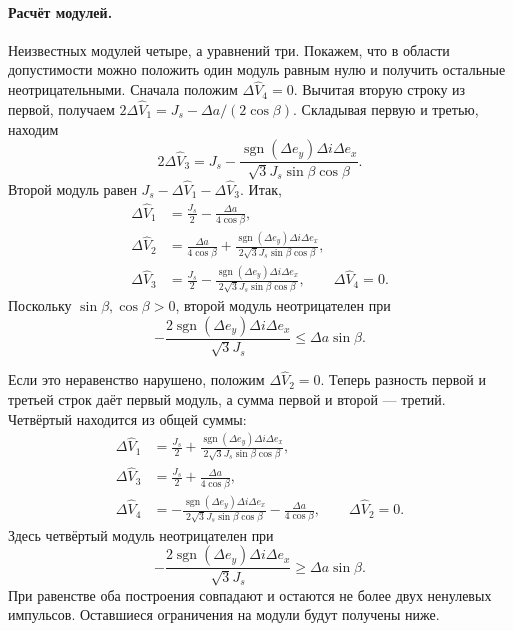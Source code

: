 \paragraph{Расчёт модулей.}
Неизвестных модулей четыре, а уравнений три. Покажем, что в области
допустимости можно положить один модуль равным нулю и получить
остальные неотрицательными.
Сначала положим $\Delta\widehat V_4=0$.
Вычитая вторую строку из первой, получаем
$2\Delta\widehat V_1=J_s-\Delta a/(2\cos\beta)$.
Складывая первую и третью, находим
\[
 2\Delta\widehat V_3=J_s-
 \frac{\operatorname{sgn}(\Delta e_y)\Delta i\Delta e_x}
      {\sqrt3J_s\sin\beta\cos\beta}.
\]
Второй модуль равен $J_s-\Delta\widehat V_1-\Delta\widehat V_3$.
Итак,
\begin{equation}
\begin{aligned}
 \Delta\widehat V_1&=\frac{J_s}{2}-\frac{\Delta a}{4\cos\beta},\\
 \Delta\widehat V_2&=\frac{\Delta a}{4\cos\beta}
                   +\frac{\operatorname{sgn}(\Delta e_y)\Delta i\Delta e_x}
                          {2\sqrt3J_s\sin\beta\cos\beta},\\
 \Delta\widehat V_3&=\frac{J_s}{2}
                   -\frac{\operatorname{sgn}(\Delta e_y)\Delta i\Delta e_x}
                          {2\sqrt3J_s\sin\beta\cos\beta},\qquad
 \Delta\widehat V_4=0.
\end{aligned}
\label{eq:sc-first-three}
\end{equation}
Поскольку $\sin\beta,\cos\beta>0$, второй модуль неотрицателен
при
\[
 -\frac{2\operatorname{sgn}(\Delta e_y)\Delta i\Delta e_x}{\sqrt3J_s}
       \leq\Delta a\sin\beta.
\]

Если это неравенство нарушено, положим
$\Delta\widehat V_2=0$. Теперь разность первой и третьей строк
даёт первый модуль, а сумма первой и второй --- третий.
Четвёртый находится из общей суммы:
\begin{equation}
\begin{aligned}
 \Delta\widehat V_1&=\frac{J_s}{2}
                   +\frac{\operatorname{sgn}(\Delta e_y)\Delta i\Delta e_x}
                          {2\sqrt3J_s\sin\beta\cos\beta},\\
 \Delta\widehat V_3&=\frac{J_s}{2}+\frac{\Delta a}{4\cos\beta},\\
 \Delta\widehat V_4&=-\frac{\operatorname{sgn}(\Delta e_y)\Delta i\Delta e_x}
                          {2\sqrt3J_s\sin\beta\cos\beta}
                   -\frac{\Delta a}{4\cos\beta},\qquad
 \Delta\widehat V_2=0.
\end{aligned}
\label{eq:sc-last-three}
\end{equation}
Здесь четвёртый модуль неотрицателен при
\[
 -\frac{2\operatorname{sgn}(\Delta e_y)\Delta i\Delta e_x}{\sqrt3J_s}
       \geq\Delta a\sin\beta.
\]
При равенстве оба построения совпадают и остаются не более двух
ненулевых импульсов. Оставшиеся ограничения на модули будут
получены ниже.

